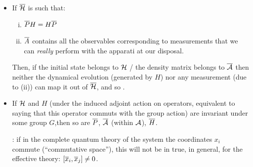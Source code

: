 {\begin{itemize}
        At least for the low energy effective theories, given an observable $A$, e.g. $A = x_1$ in the Landau model,  here we find the corresponding commutation relations between ``position observables'']
        
        \item If $\overline{\mathcal H}$ is such that:
        
            \begin{enumerate}[(i)]
            
            \item $\overline{P} H = H \overline{P}$
            
            \item $\overline{A}$  contains all the observables corresponding to measurements that we can \textit{really} perform with the apparati at our disposal.
                
            \end{enumerate}
            
        Then, if the initial state belongs to $\mathcal H$ / the density matrix belongs to $\overline{\mathcal A}$ then neither the dynamical evolution (generated by $H$) nor any measurement (due to (ii)) can map it out of $\overline{\mathcal H}$, and so .
        
        \item If $\mathcal H$ and $H$ (under the induced adjoint action on operators, equivalent to saying that this operator commuts with the group action) are invariant under some group $G$,then so are $\overline{P}$, $\overline{\mathcal A}$ (within $\mathcal A$), $\overline{H}$.
        
        : if in the complete quantum theory of the system the coordinates $x_i$ commute (``commutative space''), this will not be in true, in general, for the effective theory: $[\overline{x}_i, \overline{x}_j] \neq 0$.
        

\end{itemize}}
